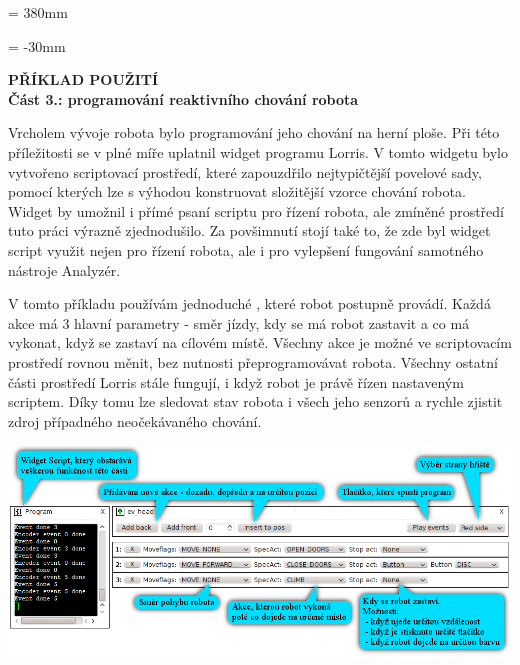 \documentclass[17pt]{extreport}
\newcommand{\B}{\textbf} %
\begin{document}
\textheight = 380mm
\newpage
\enlargethispage{200mm} %
\begin{landscape}
\voffset = -30mm %
\setlength{\textwidth}{950pt}
\begin{center}
    \Large \B{PŘÍKLAD POUŽITÍ \\ Část 3.: programování reaktivního chování robota}
\end{center}
\vspace{5mm}
Vrcholem vývoje robota bylo programování jeho chování na herní ploše. Při této příležitosti se v plné míře uplatnil widget  programu Lorris. V tomto widgetu bylo vytvořeno scriptovací prostředí, které zapouzdřilo nejtypičtější povelové sady, pomocí kterých lze s výhodou konstruovat složitější vzorce chování robota. Widget  by umožnil i přímé psaní scriptu pro řízení robota, ale zmíněné prostředí tuto práci výrazně zjednodušilo. Za povšimnutí stojí také to, že zde byl widget script využit nejen pro řízení robota, ale i pro vylepšení fungování samotného nástroje Analyzér.  
 
V tomto příkladu používám jednoduché , které robot postupně provádí. Každá akce má 3 hlavní parametry - směr jízdy, kdy se má robot zastavit a co má vykonat, když se zastaví na cílovém místě. Všechny akce je možné ve scriptovacím prostředí rovnou měnit, bez nutnosti přeprogramovávat robota. Všechny ostatní části prostředí Lorris stále fungují, i když robot je právě řízen nastaveným scriptem. Díky tomu lze sledovat stav robota i všech jeho senzorů a rychle zjistit zdroj případného neočekávaného chování. 
\begin{center}
\vspace{20mm}
\includegraphics{img/control2.png}
\end{center}
\end{landscape}
\end{document}

